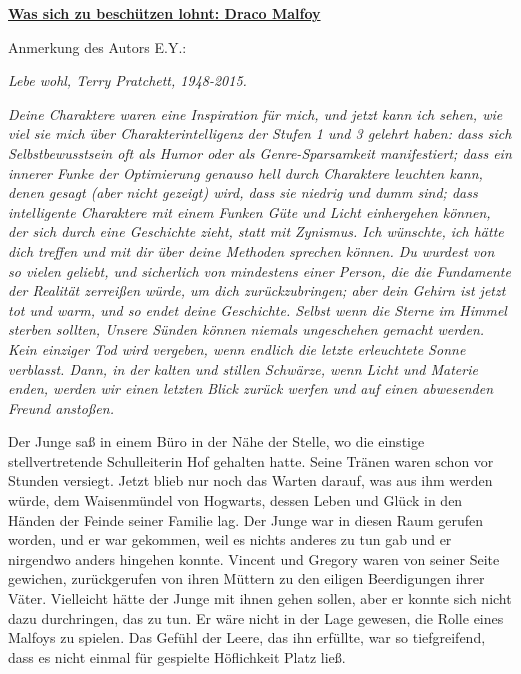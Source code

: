 

\hypertarget{was-sich-zu-beschuxfctzen-lohnt-draco-malfoy}{%

\textbf{\uline{Was sich zu beschützen lohnt: Draco Malfoy}}

Anmerkung des Autors E.Y.:

\emph{Lebe wohl, Terry Pratchett, 1948-2015.}

\emph{Deine Charaktere waren eine Inspiration für mich, und jetzt kann ich sehen, wie viel sie mich über Charakterintelligenz der Stufen 1 und 3 gelehrt haben: dass sich Selbstbewusstsein oft als Humor oder als Genre-Sparsamkeit manifestiert; dass ein innerer Funke der Optimierung genauso hell durch Charaktere leuchten kann, denen gesagt (aber nicht gezeigt) wird, dass sie niedrig und dumm sind; dass intelligente Charaktere mit einem Funken Güte und Licht einhergehen können, der sich durch eine Geschichte zieht, statt mit Zynismus. Ich wünschte, ich hätte dich treffen und mit dir über deine Methoden sprechen können. Du wurdest von so vielen geliebt, und sicherlich von mindestens einer Person, die die Fundamente der Realität zerreißen würde, um dich zurückzubringen; aber dein Gehirn ist jetzt tot und warm, und so endet deine Geschichte. Selbst wenn die Sterne im Himmel sterben sollten, Unsere Sünden können niemals ungeschehen gemacht werden. Kein einziger Tod wird vergeben, wenn endlich die letzte erleuchtete Sonne verblasst. Dann, in der kalten und stillen Schwärze, wenn Licht und Materie enden, werden wir einen letzten Blick zurück werfen und auf einen abwesenden Freund anstoßen.}

Der Junge saß in einem Büro in der Nähe der Stelle, wo die einstige stellvertretende Schulleiterin Hof gehalten hatte. Seine Tränen waren schon vor Stunden versiegt. Jetzt blieb nur noch das Warten darauf, was aus ihm werden würde, dem Waisenmündel von Hogwarts, dessen Leben und Glück in den Händen der Feinde seiner Familie lag. Der Junge war in diesen Raum gerufen worden, und er war gekommen, weil es nichts anderes zu tun gab und er nirgendwo anders hingehen konnte. Vincent und Gregory waren von seiner Seite gewichen, zurückgerufen von ihren Müttern zu den eiligen Beerdigungen ihrer Väter. Vielleicht hätte der Junge mit ihnen gehen sollen, aber er konnte sich nicht dazu durchringen, das zu tun. Er wäre nicht in der Lage gewesen, die Rolle eines Malfoys zu spielen. Das Gefühl der Leere, das ihn erfüllte, war so tiefgreifend, dass es nicht einmal für gespielte Höflichkeit Platz ließ.

}
